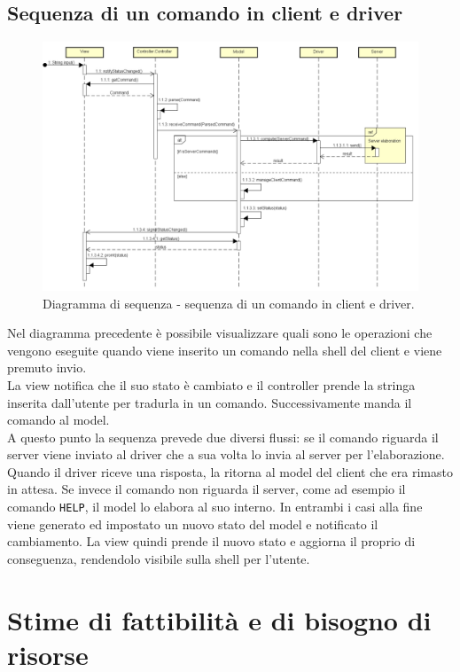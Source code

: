 \documentclass[a4paper]{article}
\begin{document}
        \subsection{Sequenza di un comando in client e driver}
            \begin{figure} [H]
                \centering
                \includegraphics[width=\textwidth]{ST/seq/sequenzaClient.png}
                \caption{Diagramma di sequenza - sequenza di un comando in client e driver.}
            \end{figure}
            Nel diagramma precedente è possibile visualizzare quali sono le operazioni che vengono eseguite quando viene inserito un comando nella shell del client e viene premuto invio. \\
            La view notifica che il suo stato è cambiato e il controller prende la stringa inserita dall'utente per tradurla in un comando. Successivamente manda il comando al model. \\
            A questo punto la sequenza prevede due diversi flussi: se il comando riguarda il server viene inviato al driver che a sua volta lo invia al server per l'elaborazione. Quando il driver riceve una risposta, la ritorna al model del client che era rimasto in attesa. Se invece il comando non riguarda il server, come ad esempio il comando \texttt{HELP}, il model lo elabora al suo interno. In entrambi i casi alla fine viene generato ed impostato un nuovo stato del model e notificato il cambiamento. La  view quindi prende il nuovo stato e aggiorna il proprio di conseguenza, rendendolo visibile sulla shell per l'utente.

	\newpage 
	\section{Stime di fattibilità e di bisogno di risorse}
	
\end{document}

